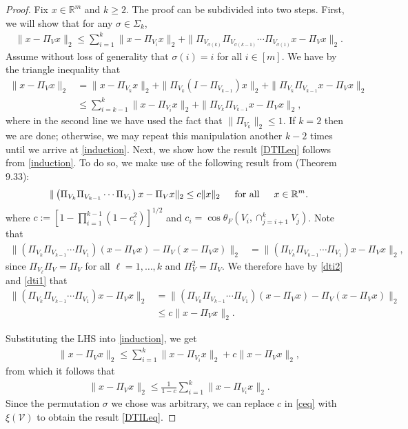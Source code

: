 \documentclass[journal, onecolumn]{IEEEtran}
\begin{document}
\begin{proof} 
Fix $x \in \mathbb{R}^m$ and $k \geq 2$. The proof can be subdivided into two steps. First, we will show that for any $\sigma \in \Sigma_k$,
\begin{align}\label{induction}
\|x - \Pi_Vx\|_2 \leq \sum_{i=1}^k \|x - \Pi_{V_i} x\|_2 + \|\Pi_{V_{\sigma(k)}}\Pi_{V_{\sigma(k-1)}}\cdots\Pi_{V_{\sigma(1)}} x - \Pi_V x\|_2.
\end{align}
%
Assume without loss of generality that $\sigma(i) = i$ for all $i \in [m]$. We have by the triangle inequality that
\begin{align*}
\|x - \Pi_Vx\|_2 &= \|x - \Pi_{V_k} x\|_2 + \|\Pi_{V_k}(I - \Pi_{V_{k-1}}) x\|_2 + \|\Pi_{V_k}\Pi_{V_{k-1}}x - \Pi_Vx\|_2 \\
&\leq \sum_{i=k-1}^k\|x - \Pi_{V_i} x\|_2 + \|\Pi_{V_k}\Pi_{V_{k-1}} x - \Pi_V x\|_2,
\end{align*}
%
where in the second line we have used the fact that $\|\Pi_{V_k}\|_2 \leq 1$. If $k=2$ then we are done; otherwise, we may repeat this manipulation another $k-2$ times until we arrive at \eqref{induction}. Next, we show how the result \eqref{DTILeq} follows from \eqref{induction}. To do so, we make use of the following result from \cite{Deutsch} (Theorem 9.33):
\begin{align}\label{dti2}
\|\left(\Pi_{V_k}\Pi_{V_{k-1}}\cdots\Pi_{V_1}\right)x - \Pi_Vx\|_2 \leq c \|x\|_2 \indent \text{for all} \indent x \in \mathbb{R}^m.
\end{align}
%
where $c:= \left[1 - \prod_{i=1}^{k-1}(1-c_i^2)\right]^{1/2}$ and $c_i = \cos\theta_F\left(V_i, \cap_{j=i+1}^kV_j\right)$. Note that
\begin{align}\label{dti1}
\|(\Pi_{V_k}\Pi_{V_{k-1}}\cdots\Pi_{V_1})(x - \Pi_Vx) - \Pi_V(x - \Pi_Vx)\|_2 
&= \|(\Pi_{V_k}\Pi_{V_{k-1}}\cdots\Pi_{V_1}) x - \Pi_V x \|_2,
\end{align}
%
since $\Pi_{V_\ell} \Pi_V = \Pi_V$ for all $\ell = 1, \ldots, k$ and $\Pi_V^2 = \Pi_V$.
%
We therefore have by \eqref{dti2} and \eqref{dti1} that
\begin{align*}
\|(\Pi_{V_k}\Pi_{V_{k-1}}\cdots\Pi_{V_1}) x - \Pi_V x \|_2
&= \|(\Pi_{V_k}\Pi_{V_{k-1}}\cdots\Pi_{V_1})(x - \Pi_Vx) - \Pi_V(x - \Pi_Vx)\|_2 \\
&\leq c \|x - \Pi_Vx\|_2.
\end{align*}

Substituting the LHS into \eqref{induction}, we get
\begin{align*}
\|x - \Pi_Vx\|_2 \leq \sum_{i=1}^k \|x - \Pi_{V_i} x\|_2 + c \|x - \Pi_Vx\|_2,
\end{align*}
%
from which it follows that
\begin{align}\label{ceq}
\|x - \Pi_V x\|_2 \leq \frac{1}{1 - c} \sum_{i=1}^k \|x - \Pi_{V_i} x\|_2.
\end{align}
Since the permutation $\sigma$ we chose was arbitrary, we can replace $c$ in \eqref{ceq} with $\xi(\mathcal{V})$ to obtain the result \eqref{DTILeq}.
\end{proof}
\end{document}
